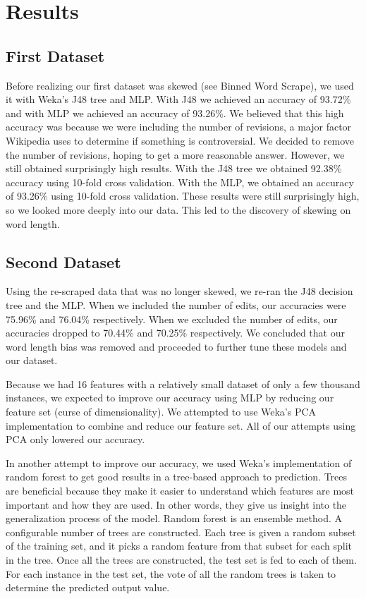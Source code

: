 \documentclass{article}
\begin{document}
\section{Results}

\subsection{First Dataset}

Before realizing our first dataset was skewed (see Binned Word Scrape), we used it with Weka’s J48 tree and MLP. With J48 we achieved an accuracy of 93.72\% and with MLP we achieved an accuracy of 93.26\%. We believed that this high accuracy was because we were including the number of revisions, a major factor Wikipedia uses to determine if something is controversial. We decided to remove the number of revisions, hoping to get a more reasonable answer. However, we still obtained surprisingly high results. With the J48 tree we obtained 92.38\% accuracy using 10-fold cross validation. With the MLP, we obtained an accuracy of 93.26\% using 10-fold cross validation. These results were still surprisingly high, so we looked more deeply into our data. This led to the discovery of skewing on word length.

\subsection{Second Dataset}
Using the re-scraped data that was no longer skewed, we re-ran the J48 decision tree and the MLP. When we included the number of edits, our accuracies were 75.96\% and 76.04\% respectively. When we excluded the number of edits, our accuracies dropped to 70.44\% and 70.25\% respectively. We concluded that our word length bias was removed and proceeded to further tune these models and our dataset.

Because we had 16 features with a relatively small dataset of only a few thousand instances, we expected to improve our accuracy using MLP by reducing our feature set (curse of dimensionality). We attempted to use Weka’s PCA implementation to combine and reduce our feature set. All of our attempts using PCA only lowered our accuracy.

In another attempt to improve our accuracy, we used Weka’s implementation of random forest to get good results in a tree-based approach to prediction. Trees are beneficial because they make it easier to understand which features are most important and how they are used. In other words, they give us insight into the generalization process of the model. Random forest is an ensemble method. A configurable number of trees are constructed. Each tree is given a random subset of the training set, and it picks a random feature from that subset for each split in the tree. Once all the trees are constructed, the test set is fed to each of them. For each instance in the test set, the vote of all the random trees is taken to determine the predicted output value.
\end{document}
